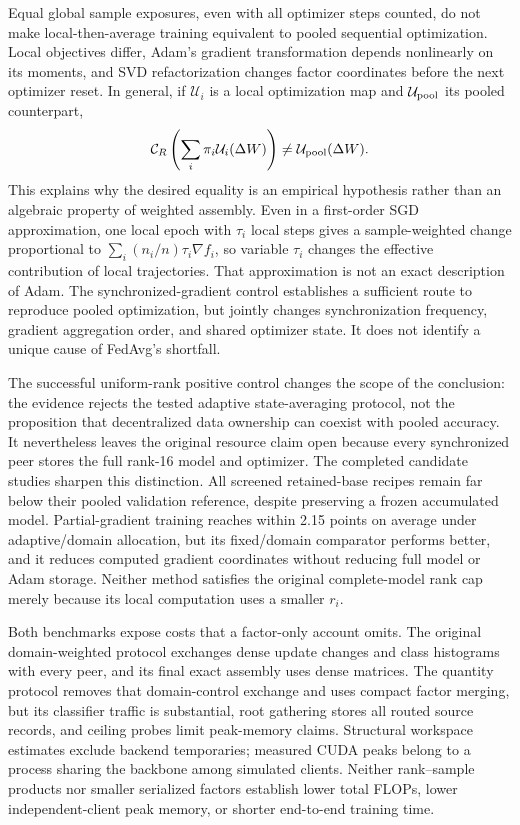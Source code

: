 \documentclass[11pt]{article}
\newcommand{\dW}{\Delta W}
\begin{document}
Equal global sample exposures, even with all optimizer steps counted, do not make local-then-average training equivalent to pooled sequential optimization. Local objectives differ, Adam's gradient transformation depends nonlinearly on its moments, and SVD refactorization changes factor coordinates before the next optimizer reset. In general, if $\mathcal U_i$ is a local optimization map and $\mathcal U_{\rm pool}$ its pooled counterpart,
\begin{equation}
 \mathcal C_R\left(\sum_i\pi_i\mathcal U_i(\dW)\right)
 \ne \mathcal U_{\rm pool}(\dW).
\end{equation}
This explains why the desired equality is an empirical hypothesis rather than an algebraic property of weighted assembly. Even in a first-order SGD approximation, one local epoch with $\tau_i$ local steps gives a sample-weighted change proportional to $\sum_i(n_i/n)\tau_i\nabla f_i$, so variable $\tau_i$ changes the effective contribution of local trajectories. That approximation is not an exact description of Adam. The synchronized-gradient control establishes a sufficient route to reproduce pooled optimization, but jointly changes synchronization frequency, gradient aggregation order, and shared optimizer state. It does not identify a unique cause of FedAvg's shortfall.

The successful uniform-rank positive control changes the scope of the conclusion: the evidence rejects the tested adaptive state-averaging protocol, not the proposition that decentralized data ownership can coexist with pooled accuracy. It nevertheless leaves the original resource claim open because every synchronized peer stores the full rank-16 model and optimizer. The completed candidate studies sharpen this distinction. All screened retained-base recipes remain far below their pooled validation reference, despite preserving a frozen accumulated model. Partial-gradient training reaches within 2.15 points on average under adaptive/domain allocation, but its fixed/domain comparator performs better, and it reduces computed gradient coordinates without reducing full model or Adam storage. Neither method satisfies the original complete-model rank cap merely because its local computation uses a smaller $r_i$.

Both benchmarks expose costs that a factor-only account omits. The original domain-weighted protocol exchanges dense update changes and class histograms with every peer, and its final exact assembly uses dense matrices. The quantity protocol removes that domain-control exchange and uses compact factor merging, but its classifier traffic is substantial, root gathering stores all routed source records, and ceiling probes limit peak-memory claims. Structural workspace estimates exclude backend temporaries; measured CUDA peaks belong to a process sharing the backbone among simulated clients. Neither rank--sample products nor smaller serialized factors establish lower total FLOPs, lower independent-client peak memory, or shorter end-to-end training time.
\end{document}
